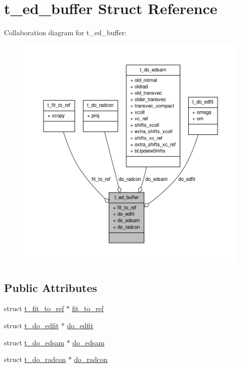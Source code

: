 \hypertarget{structt__ed__buffer}{\section{t\-\_\-ed\-\_\-buffer \-Struct \-Reference}
\label{structt__ed__buffer}
}


\-Collaboration diagram for t\-\_\-ed\-\_\-buffer\-:
\nopagebreak
\begin{figure}[H]
\begin{center}
\leavevmode
\includegraphics[width=350pt]{structt__ed__buffer__coll__graph}
\end{center}
\end{figure}
\subsection*{\-Public \-Attributes}
\begin{DoxyCompactItemize}
\item 
struct \hyperlink{structt__fit__to__ref}{t\-\_\-fit\-\_\-to\-\_\-ref} $\ast$ \hyperlink{structt__ed__buffer_a5c268eeae8e5347b3b6b563c38e47b03}{fit\-\_\-to\-\_\-ref}
\item 
struct \hyperlink{structt__do__edfit}{t\-\_\-do\-\_\-edfit} $\ast$ \hyperlink{structt__ed__buffer_a39f51c2ce34563b357af26fd1fbc7088}{do\-\_\-edfit}
\item 
struct \hyperlink{structt__do__edsam}{t\-\_\-do\-\_\-edsam} $\ast$ \hyperlink{structt__ed__buffer_affdc2038b5fb3f3094b313ee77baa15a}{do\-\_\-edsam}
\item 
struct \hyperlink{structt__do__radcon}{t\-\_\-do\-\_\-radcon} $\ast$ \hyperlink{structt__ed__buffer_a00da13304376a72401ead390eaebddb3}{do\-\_\-radcon}
\end{DoxyCompactItemize}


